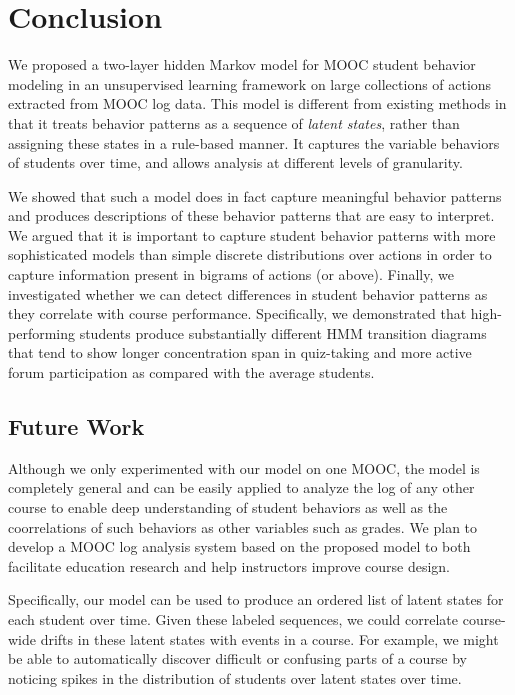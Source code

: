 \section{Conclusion}
We proposed a two-layer hidden Markov model for MOOC student behavior
modeling in an unsupervised learning framework on large collections of
actions extracted from MOOC log data. This model is different from existing
methods in that it treats behavior patterns as a sequence of \emph{latent
states}, rather than assigning these states in a rule-based manner. It
captures the variable behaviors of students over time, and allows
analysis at different levels of granularity.

We showed that such a model does in fact capture meaningful behavior
patterns and produces descriptions of these behavior patterns that are easy
to interpret. We argued that it is important to capture student behavior
patterns with more sophisticated models than simple discrete distributions
over actions in order to capture information present in bigrams of actions
(or above). Finally, we investigated whether we can detect differences in
student behavior patterns as they correlate with course performance.
Specifically, we demonstrated that high-performing students produce
substantially different HMM transition diagrams that tend to show longer
concentration span in quiz-taking and more active forum participation as
compared with the average students.

\subsection{Future Work}

Although we only experimented with our model on one MOOC, the model is
completely general and can be easily applied to analyze the log of any
other course to enable deep understanding of student behaviors as well as
the coorrelations of such behaviors as other variables such as grades. We
plan to develop a MOOC log analysis system based on the proposed model to
both facilitate education research and help instructors improve course
design.

Specifically, our model can be used to produce an ordered list of latent
states for each student over time. Given these labeled sequences, we could
correlate course-wide drifts in these latent states with events in a
course. For example, we might be able to automatically discover difficult
or confusing parts of a course by noticing spikes in the distribution of
students over latent states over time.


